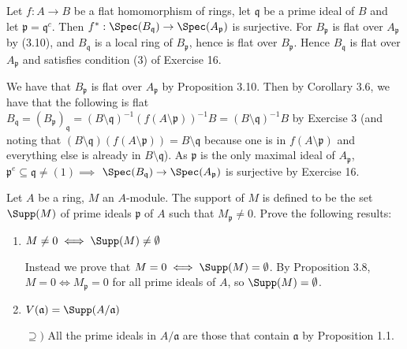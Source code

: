\begin{questions}
\question Let $f: A\to B $ be a flat homomorphism of rings, let $\mathfrak{q} $ be a prime ideal of $B $ and let $\mathfrak{p} = \mathfrak{q}^c $. Then $f^\ast: \Spec(B_{\mathfrak{q}}) \to \Spec(A_{\mathfrak{p}}) $ is surjective.
\ifhint
	For $B_{\mathfrak{p}} $ is flat over $A_{\mathfrak{p}} $ by (3.10), and $B_{\mathfrak{q}} $ is a local ring of $B_{\mathfrak{p}} $, hence is flat over $B_{\mathfrak{p}} $. Hence $B_{\mathfrak{q}} $ is flat over $A_{\mathfrak{p}} $ and satisfies condition (3) of Exercise 16.
\fi
\begin{solution}
	We have that $B_{\mathfrak{p}} $ is flat over $A_{\mathfrak{p}} $ by Proposition 3.10.
	Then by Corollary 3.6, we have that the following is flat $B_{\mathfrak{q}} = (B_{\mathfrak{p}})_{\mathfrak{q}} = (B \setminus \mathfrak{q})^{-1} (f(A\setminus \mathfrak{p}))^{-1} B = (B \setminus \mathfrak{q})^{-1} B$ by Exercise 3 (and noting that $(B \setminus \mathfrak{q})(f(A \setminus \mathfrak{p})) = B\setminus \mathfrak{q}$ because one is in $f(A \setminus \mathfrak{p}) $ and everything else is already in $B \setminus \mathfrak{q} $).
	As $\mathfrak{p} $ is the only maximal ideal of $A_{\mathfrak{p}} $, $\mathfrak{p}^e \subseteq \mathfrak{q} \ne (1) \implies $ $\Spec(B_{\mathfrak{q}}) \to \Spec(A_{\mathfrak{p}}) $ is surjective by Exercise 16.
\end{solution}

\question Let $A $ be a ring, $M $ an $A $-module. The support of $M $ is defined to be the set $\Supp(M)$ of prime ideals $\mathfrak{p} $ of $A $ such that $M_{\mathfrak{p}}\ne 0 $. Prove the following results:
\begin{enumerate}
	\item $M\ne 0 \iff \Supp(M) \ne \emptyset $
	\begin{solution}
		Instead we prove that $M = 0 \iff \Supp(M) = \emptyset $.
		By Proposition 3.8, $M = 0 \iff M_{\mathfrak{p}} = 0 $ for all prime ideals of $A $, so $\Supp(M) = \emptyset $.
	\end{solution}
	\item $V(\mathfrak{a}) = \Supp(A / \mathfrak{a}) $
	\begin{solution}
		$\supseteq) $ All the prime ideals in $A / \mathfrak{a} $ are those that contain $\mathfrak{a} $ by Proposition 1.1.


\end{solution}
\end{enumerate}
\end{questions}

